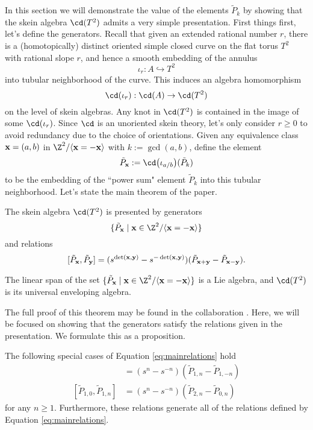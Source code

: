 In this section we will demonstrate the value of the elements $\tilde{P}_k$  by showing that the skein algebra $\cd(T^2)$ admits a very simple presentation. First things first, let's define the generators. Recall that given an extended rational number $r$, there is a (homotopically) distinct oriented simple closed curve on the flat torus $T^2$ with rational slope $r$, and hence a smooth embedding of the annulus 
\[
\iota_r: A \hookrightarrow T^2
\]
into tubular neighborhood of the curve. This induces an algebra homomorphism
\[
\cd(\iota_r): \cd(A) \to \cd(T^2)
\]
on the level of skein algebras. Any knot in $\cd(T^2)$ is contained in the image of some $\cd(\iota_r)$. Since $\cd$ is an unoriented skein theory, let's only consider $r \geq 0$ to avoid redundancy due to the choice of orientations. Given any equivalence class ${\mathbf{x}} = (a, b)$ in $\Z^2 / \langle \xx = - \xx \rangle$ with $k := \gcd(a, b)$, define the element
\[
\tilde{P}_\xx := \cd\big(\iota_{a/b}\big)(\tilde{P}_k)
\]
to be the embedding of the ``power sum" element $\tilde{P}_k$ into this tubular neighborhood. Let's state the main theorem of the paper.

\begin{theorem} \label{thm:toruspresentation}
The skein algebra $\cd(T^2)$ is presented by generators 
\[
\{ \tilde{P}_\xx \mid \xx \in \Z^2 / \langle \xx = - \xx \rangle \}
\]
and relations
\begin{equation} \label{eq:mainrelations}
[\tilde{P}_{\mathbf{x}}, \tilde{P}_{\mathbf{y}}] = (s^{\det({\mathbf{x}}, {\mathbf{y}})} - s^{-\det({\mathbf{x}}, {\mathbf{y}})}) (\tilde{P}_{{\mathbf{x}} + {\mathbf{y}}} - \tilde{P}_{{\mathbf{x}} - {\mathbf{y}}}).
\end{equation}
\end{theorem}

\begin{corollary}
The linear span of the set $\{ \tilde{P}_\xx \mid \xx \in \Z^2 / \langle \xx = - \xx \rangle \}$ is a Lie algebra, and  $\cd(T^2)$ is its universal enveloping algebra. 
\end{corollary}

The full proof of this theorem may be found in the collaboration . Here, we will be focused on showing that the generators satisfy the relations given in the presentation. We formulate this as a proposition.
\begin{proposition}
The following special cases of Equation \eqref{eq:mainrelations} hold
\begin{align}
[\tilde{P}_{1, 0}, \tilde{P}_{0, n}] &= (s^n - s^{-n}) (\tilde{P}_{1, n} - \tilde{P}_{1, -n}) \label{eq:perprelations} \\
[\tilde{P}_{1, 0}, \tilde{P}_{1, n}] &= (s^n - s^{-n}) (\tilde{P}_{2, n} - \tilde{P}_{0, n}) \label{eq:angledrelations}
\end{align}
for any $n \geq 1$. Furthermore, these relations generate all of the relations defined by Equation \eqref{eq:mainrelations}.
\end{proposition}

